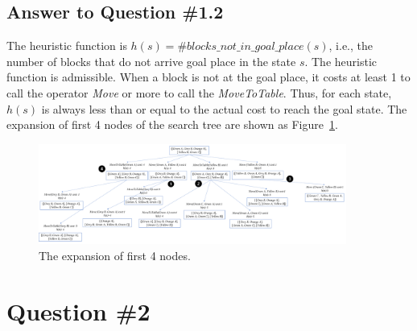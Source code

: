 \documentclass[conference]{styles/acmsiggraph}
\begin{document}
\subsection{Answer to Question \#1.2}

The heuristic function is $h(s) = \#blocks\_not\_in\_goal\_place (s)$, i.e., the number of blocks that do not arrive goal place in the state $s$. The heuristic function is admissible. When a block is not at the goal place, it costs at least 1 to call the operator \textit{Move} or more to call the \textit{MoveToTable}. Thus, for each state, $h(s)$ is always less than or equal to the actual cost to reach the goal state. The expansion of first 4 nodes of the search tree are shown as Figure~\ref{fig:q1}.

\begin{figure}[!h]
	\centering
	\includegraphics[width=0.9\textwidth]{figures/q1.pdf}
	\caption{The expansion of first 4 nodes.}
	\label{fig:q1}
\end{figure}


\section{Question \#2}
\end{document}
